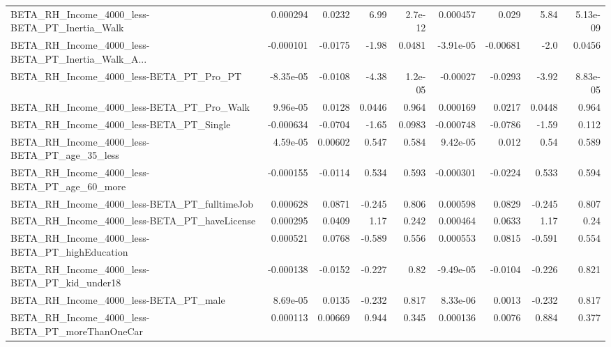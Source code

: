 \begin{tabular}{lrrrrrrrr}
BETA\_RH\_Income\_4000\_less-BETA\_PT\_Inertia\_Walk      &    0.000294 &       0.0232 &     6.99 &  2.7e-12 &   0.000457 &       0.029 &         5.84 &      5.13e-09 \\
BETA\_RH\_Income\_4000\_less-BETA\_PT\_Inertia\_Walk\_A... &   -0.000101 &      -0.0175 &    -1.98 &   0.0481 &  -3.91e-05 &    -0.00681 &         -2.0 &        0.0456 \\
BETA\_RH\_Income\_4000\_less-BETA\_PT\_Pro\_PT            &   -8.35e-05 &      -0.0108 &    -4.38 &  1.2e-05 &   -0.00027 &     -0.0293 &        -3.92 &      8.83e-05 \\
BETA\_RH\_Income\_4000\_less-BETA\_PT\_Pro\_Walk          &    9.96e-05 &       0.0128 &   0.0446 &    0.964 &   0.000169 &      0.0217 &       0.0448 &         0.964 \\
BETA\_RH\_Income\_4000\_less-BETA\_PT\_Single            &   -0.000634 &      -0.0704 &    -1.65 &   0.0983 &  -0.000748 &     -0.0786 &        -1.59 &         0.112 \\
BETA\_RH\_Income\_4000\_less-BETA\_PT\_age\_35\_less       &    4.59e-05 &      0.00602 &    0.547 &    0.584 &   9.42e-05 &       0.012 &         0.54 &         0.589 \\
BETA\_RH\_Income\_4000\_less-BETA\_PT\_age\_60\_more       &   -0.000155 &      -0.0114 &    0.534 &    0.593 &  -0.000301 &     -0.0224 &        0.533 &         0.594 \\
BETA\_RH\_Income\_4000\_less-BETA\_PT\_fulltimeJob       &    0.000628 &       0.0871 &   -0.245 &    0.806 &   0.000598 &      0.0829 &       -0.245 &         0.807 \\
BETA\_RH\_Income\_4000\_less-BETA\_PT\_haveLicense       &    0.000295 &       0.0409 &     1.17 &    0.242 &   0.000464 &      0.0633 &         1.17 &          0.24 \\
BETA\_RH\_Income\_4000\_less-BETA\_PT\_highEducation     &    0.000521 &       0.0768 &   -0.589 &    0.556 &   0.000553 &      0.0815 &       -0.591 &         0.554 \\
BETA\_RH\_Income\_4000\_less-BETA\_PT\_kid\_under18       &   -0.000138 &      -0.0152 &   -0.227 &     0.82 &  -9.49e-05 &     -0.0104 &       -0.226 &         0.821 \\
BETA\_RH\_Income\_4000\_less-BETA\_PT\_male              &    8.69e-05 &       0.0135 &   -0.232 &    0.817 &   8.33e-06 &      0.0013 &       -0.232 &         0.817 \\
BETA\_RH\_Income\_4000\_less-BETA\_PT\_moreThanOneCar    &    0.000113 &      0.00669 &    0.944 &    0.345 &   0.000136 &      0.0076 &        0.884 &         0.377 \\

\end{tabular}
